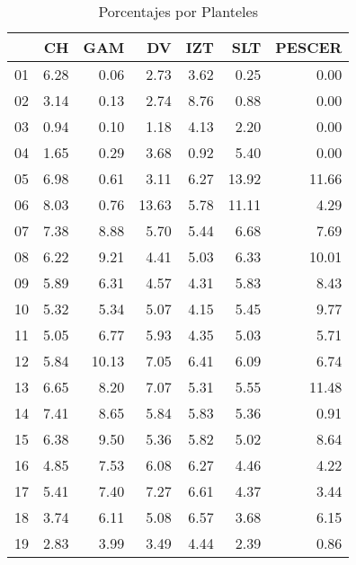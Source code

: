 \documentclass{article}
\begin{document}
\begin{table}[ht]
\centering
\caption{Porcentajes por Planteles} 
\begin{tabular}{rrrrrrr}
  \hline
 & CH & GAM & DV & IZT & SLT & PESCER \\ 
  \hline
01 & 6.28 & 0.06 & 2.73 & 3.62 & 0.25 & 0.00 \\ 
  02 & 3.14 & 0.13 & 2.74 & 8.76 & 0.88 & 0.00 \\ 
  03 & 0.94 & 0.10 & 1.18 & 4.13 & 2.20 & 0.00 \\ 
  04 & 1.65 & 0.29 & 3.68 & 0.92 & 5.40 & 0.00 \\ 
  05 & 6.98 & 0.61 & 3.11 & 6.27 & 13.92 & 11.66 \\ 
  06 & 8.03 & 0.76 & 13.63 & 5.78 & 11.11 & 4.29 \\ 
  07 & 7.38 & 8.88 & 5.70 & 5.44 & 6.68 & 7.69 \\ 
  08 & 6.22 & 9.21 & 4.41 & 5.03 & 6.33 & 10.01 \\ 
  09 & 5.89 & 6.31 & 4.57 & 4.31 & 5.83 & 8.43 \\ 
  10 & 5.32 & 5.34 & 5.07 & 4.15 & 5.45 & 9.77 \\ 
  11 & 5.05 & 6.77 & 5.93 & 4.35 & 5.03 & 5.71 \\ 
  12 & 5.84 & 10.13 & 7.05 & 6.41 & 6.09 & 6.74 \\ 
  13 & 6.65 & 8.20 & 7.07 & 5.31 & 5.55 & 11.48 \\ 
  14 & 7.41 & 8.65 & 5.84 & 5.83 & 5.36 & 0.91 \\ 
  15 & 6.38 & 9.50 & 5.36 & 5.82 & 5.02 & 8.64 \\ 
  16 & 4.85 & 7.53 & 6.08 & 6.27 & 4.46 & 4.22 \\ 
  17 & 5.41 & 7.40 & 7.27 & 6.61 & 4.37 & 3.44 \\ 
  18 & 3.74 & 6.11 & 5.08 & 6.57 & 3.68 & 6.15 \\ 
  19 & 2.83 & 3.99 & 3.49 & 4.44 & 2.39 & 0.86 \\ 
   \hline
\end{tabular}
\end{table}
\end{document}
